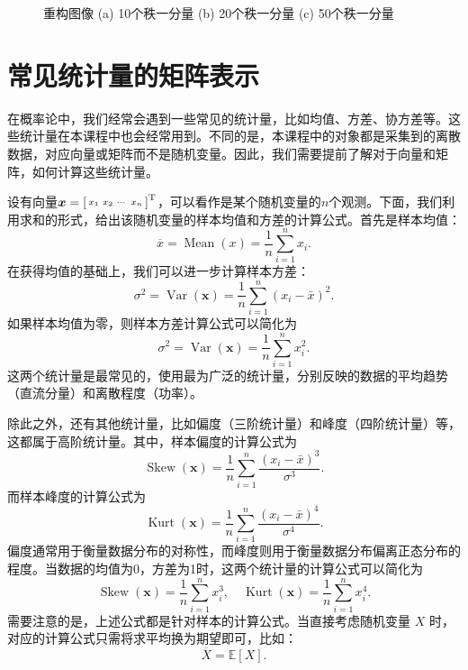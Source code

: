 \begin{solution}
\begin{figure}[htb!]
\begin{subfigure}{.3\textwidth}
            \caption{}
            \label{fig_tensor_cp_result_3}
        \end{subfigure}
        \caption{重构图像 (a) 10个秩一分量 (b) 20个秩一分量 (c) 50个秩一分量}
        \label{fig_tensor_cp_result}
    \end{figure}

\end{solution}

\maybeNewPage

\section{常见统计量的矩阵表示}

在概率论中，我们经常会遇到一些常见的统计量，比如均值、方差、协方差等。这些统计量在本课程中也会经常用到。不同的是，本课程中的对象都是采集到的离散数据，对应向量或矩阵而不是随机变量。因此，我们需要提前了解对于向量和矩阵，如何计算这些统计量。

设有向量\( \boldsymbol{x} = \begin{bsmallmatrix} x_1 & x_2 & \cdots & x_n \end{bsmallmatrix}^{\mathrm{T}} \)，可以看作是某个随机变量的\( n \)个观测。下面，我们利用求和的形式，给出该随机变量的样本均值和方差的计算公式。首先是样本均值：
\[
    \overline{x} = \operatorname{Mean}(x) = \frac{1}{n} \sum_{i=1}^n x_i.
\]
在获得均值的基础上，我们可以进一步计算样本方差：
\[
    \sigma^2 = \operatorname{Var}(\bm{x}) = \frac{1}{n} \sum_{i=1}^n (x_i - \bar{x})^2.
\]
如果样本均值为零，则样本方差计算公式可以简化为
\[
    \sigma^2 = \operatorname{Var}(\bm{x}) =  \frac{1}{n} \sum_{i=1}^n x_i^2.
\]
这两个统计量是最常见的，使用最为广泛的统计量，分别反映的数据的平均趋势（直流分量）和离散程度（功率）。

除此之外，还有其他统计量，比如偏度（三阶统计量）和峰度（四阶统计量）等，这都属于高阶统计量。其中，样本偏度的计算公式为
\[
    \operatorname{Skew}(\bm{x}) = \frac{1}{n} \sum_{i=1}^n \frac{(x_i - \bar{x})^3}{\sigma^3}.
\]
而样本峰度的计算公式为
\[
    \operatorname{Kurt}(\bm{x}) = \frac{1}{n} \sum_{i=1}^n \frac{(x_i - \bar{x})^4}{\sigma^4}.
\]
偏度通常用于衡量数据分布的对称性，而峰度则用于衡量数据分布偏离正态分布的程度。当数据的均值为0，方差为1时，这两个统计量的计算公式可以简化为
\[
    \operatorname{Skew}(\bm{x}) = \frac{1}{n} \sum_{i=1}^n x_i^3, \quad \operatorname{Kurt}(\bm{x}) = \frac{1}{n} \sum_{i=1}^n x_i^4.
\]
需要注意的是，上述公式都是针对样本的计算公式。当直接考虑随机变量 \( X \) 时，对应的计算公式只需将求平均换为期望即可，比如：
\[
    \overline{X} = \mathbb{E}[X].
\]

